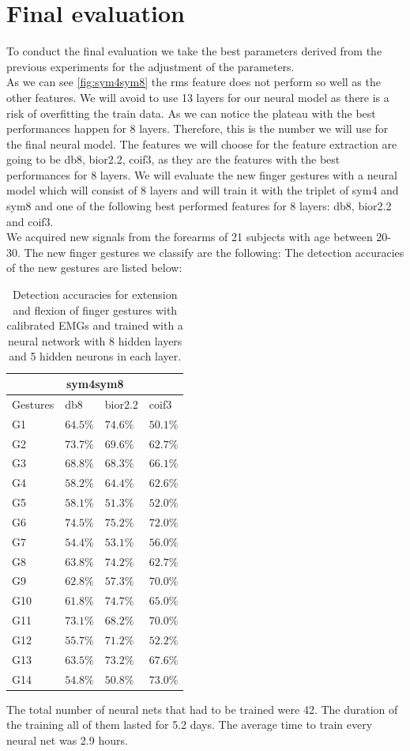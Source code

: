 \section{Final evaluation}
To conduct the final evaluation we take the best parameters derived from the previous experiments for the adjustment of the parameters.\\
As we can see \ref{fig:sym4sym8} the rms feature does not perform so well as the other features. We will avoid to use 13 layers for our neural model as there is a risk of overfitting the train data. As we can notice the plateau with the best performances happen for 8 layers. Therefore, this is the number we will use for the final neural model. The features we will choose for the feature extraction are going to be db8, bior2.2, coif3, as they are the features with the best performances for 8 layers. We will evaluate the new finger gestures with a neural model which will consist of 8 layers and will train it with the triplet of sym4 and sym8 and one of the following best performed features for 8 layers: db8, bior2.2 and coif3.\\
We acquired new signals from the forearms of 21 subjects with age between 20-30. The new finger gestures we classify are the following:
The detection accuracies of the new gestures are listed below:
\begin{table}[h!]
\renewcommand{\arraystretch}{1.2}
\centering
\begin{tabular}{ |p{1.7cm}||p{1.1cm}|p{1.1cm}|p{1.1cm}|}
 \hline
 \multicolumn{4}{|c|}{sym4sym8} \\
 \hline
 Gestures  & db8 & bior2.2 & coif3 \\
 \hline
 G1 & $64.5\%$ & $74.6\%$ & $50.1\%$ \\
 G2 & $73.7\%$ & $69.6\%$ & $62.7\%$ \\
 G3 & $68.8\%$ & $68.3\%$ & $66.1\%$ \\
 G4 & $58.2\%$ & $64.4\%$ & $62.6\%$ \\
 G5 & $58.1\%$ & $51.3\%$ & $52.0\%$ \\
 G6 & $74.5\%$ & $75.2\%$ & $72.0\%$ \\
 G7 & $54.4\%$ & $53.1\%$ & $56.0\%$ \\
 G8 & $63.8\%$ & $74.2\%$ & $62.7\%$ \\
 G9 & $62.8\%$ & $57.3\%$ & $70.0\%$ \\
 G10 & $61.8\%$ & $74.7\%$ & $65.0\%$ \\
 G11 & $73.1\%$ & $68.2\%$ & $70.0\%$ \\
 G12 & $55.7\%$ & $71.2\%$ & $52.2\%$ \\
 G13 & $63.5\%$ & $73.2\%$ & $67.6\%$ \\
 G14 & $54.8\%$ & $50.8\%$ & $73.0\%$ \\
 \hline
\end{tabular}
\caption{Detection accuracies for extension and flexion of finger gestures with calibrated EMGs and trained with a neural network with 8 hidden layers and 5 hidden neurons in each layer.}
\label{table:sym4sym8_8layers}
\end{table}
The total number of neural nets that had to be trained were 42. The duration of the training all of them lasted for 5.2 days. The average time to train every neural net was 2.9 hours. 